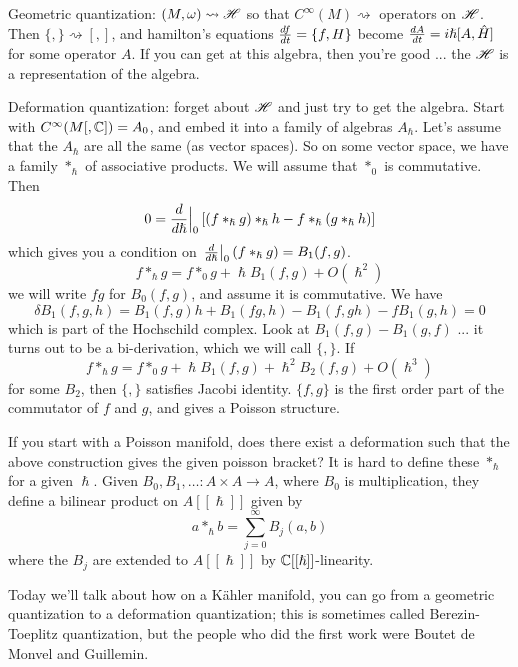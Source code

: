  \setcounter{lecture}{25}

 Geometric quantization: $(M,\omega)\rightsquigarrow \mathscr{H}$ so that
 $C^\infty(M)\rightsquigarrow $ operators on $\mathscr{H}$.  Then $\{,\}\rightsquigarrow [,]$,
 and hamilton's equations $\frac{d f}{d t} = \{f,H\}$ become $\frac{d A}{d t}=i\hslash [A,\hat
 H]$ for some operator $A$.  If you can get at this algebra, then you're good ... the
 $\mathscr{H}$ is a representation of the algebra.

 Deformation quantization: forget about $\mathscr{H}$ and just try to get the algebra.  Start
 with $C^\infty(M[,\mathbb{C}])=A_0$, and embed it into a family of algebras $A_\hslash$.
 Let's assume that the $A_\hslash$ are all the same (as vector spaces).  So on some
 vector space, we have a family $\ast_\hslash$ of associative products.  We will
 assume that $\ast_0$ is commutative.  Then
 \[
    0=\frac{d }{d \hslash}{\Big |}_0 \left[ (f\ast_\hslash g)\ast_\hslash h - f\ast_\hslash (g\ast_\hslash h) \right]
 \]
 which gives you a condition on $\left. \frac{d }{d \hslash}\right|_0 (f\ast_\hslash g) =
 B_1(f,g)$.
 \[
    f \ast_\hslash g = f\ast_0 g + \hslash B_1(f,g) + O(\hslash^2)
 \]
 we will write $fg$ for $B_0(f,g)$, and assume it is commutative. We have
 \[
    \delta B_1 (f,g,h) = B_1(f,g)h + B_1(fg,h) - B_1(f,gh) - fB_1(g,h)=0
 \]
 which is part of the Hochschild complex.  Look at $B_1(f,g)-B_1(g,f)$ ... it turns
 out to be a bi-derivation, which we will call $\{,\}$. If
 \[
   f \ast_\hslash g = f\ast_0 g + \hslash B_1(f,g) + \hslash^2 B_2(f,g)+ O(\hslash^3)
 \]
 for some $B_2$, then $\{,\}$ satisfies Jacobi identity.  $\{f,g\}$ is the first order
 part of the commutator of $f$ and $g$, and gives a Poisson structure.

 If you start with a Poisson manifold, does there exist a deformation such that the
 above construction gives the given poisson bracket?  It is hard to define these
 $\ast_\hslash$ for a given $\hslash$.  Given $B_0,B_1,\dots :A\times A \to A$, where
 $B_0$ is multiplication, they define a bilinear product on $A[[\hslash]]$ given by
 \[
    a\ast_\hslash b = \sum_{j=0}^\infty B_j(a,b)
 \]
 where the $B_j$ are extended to $A[[\hslash]]$ by $\mathbb{C}[[\hslash]]$-linearity.

 Today we'll talk about how on a K\"ahler manifold, you can go from a geometric
 quantization to a deformation quantization; this is sometimes called Berezin-Toeplitz
 quantization, but the people who did the first work were Boutet de Monvel and
 Guillemin.

